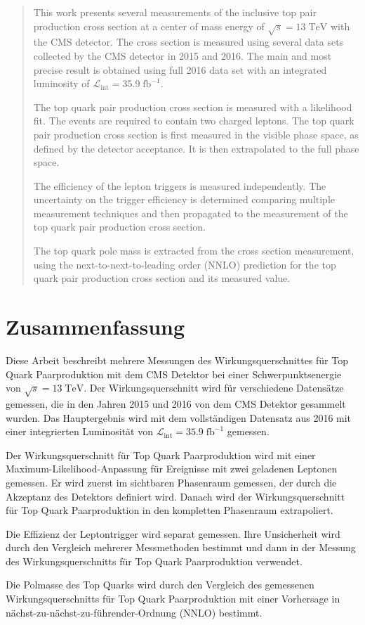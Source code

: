 \begin{abstract}
This work presents several measurements of the inclusive top pair production cross section at a center of mass energy of $\sqrt{s}=13 \; \mathrm{TeV}$ with the CMS detector.
The cross section is measured using several data sets collected by the CMS detector in 2015 and 2016. The main and most precise result is obtained using full 2016 data set with an integrated
luminosity of $\mathcal{L}_\mathrm{int}=35.9 \;\mathrm{fb}^{-1}$. 

The top quark pair production cross section is measured with a likelihood fit.
The events are required to contain two charged leptons.
The top quark pair production cross section is first measured in the visible phase space,
as defined by the detector acceptance. It is then extrapolated to the full phase space.

The efficiency of the lepton triggers is measured independently. The uncertainty on the trigger efficiency is determined comparing multiple measurement techniques and then propagated
to the measurement of the top quark pair production cross section.

The top quark pole mass is extracted from the cross section measurement, using the next-to-next-to-leading order (NNLO) prediction for the top quark pair production cross section and its measured value. 
\end{abstract}

\chapter*{\centering \Large Zusammenfassung} 

Diese Arbeit beschreibt mehrere Messungen des Wirkungsquerschnittes für Top Quark Paarproduktion mit dem CMS Detektor bei einer Schwerpunktsenergie von $\sqrt{s}=13 \; \mathrm{TeV}$.
Der Wirkungsquerschnitt wird für verschiedene Datensätze gemessen, die in den Jahren 2015 und 2016 von dem CMS Detektor gesammelt wurden.
Das Hauptergebnis wird mit dem vollständigen Datensatz aus 2016 mit einer integrierten Luminosität von $\mathcal{L}_\mathrm{int}=35.9 \;\mathrm{fb}^{-1}$ gemessen.

Der Wirkungsquerschnitt für Top Quark Paarproduktion wird mit einer Maximum-Likelihood-Anpassung für Ereignisse mit zwei geladenen Leptonen gemessen.
Er wird zuerst im sichtbaren Phasenraum gemessen, der durch die Akzeptanz des Detektors definiert wird.
Danach wird der Wirkungsquerschnitt für Top Quark Paarproduktion in den kompletten Phasenraum extrapoliert.

Die Effizienz der Leptontrigger wird separat gemessen. Ihre Unsicherheit wird durch den Vergleich mehrerer Messmethoden bestimmt und dann in der Messung des Wirkungsquerschnitts für Top Quark Paarproduktion verwendet.

Die Polmasse des Top Quarks wird durch den Vergleich des gemessenen Wirkungsquerschnitts für Top Quark Paarproduktion mit einer Vorhersage in nächst-zu-nächst-zu-führender-Ordnung (NNLO) bestimmt.




